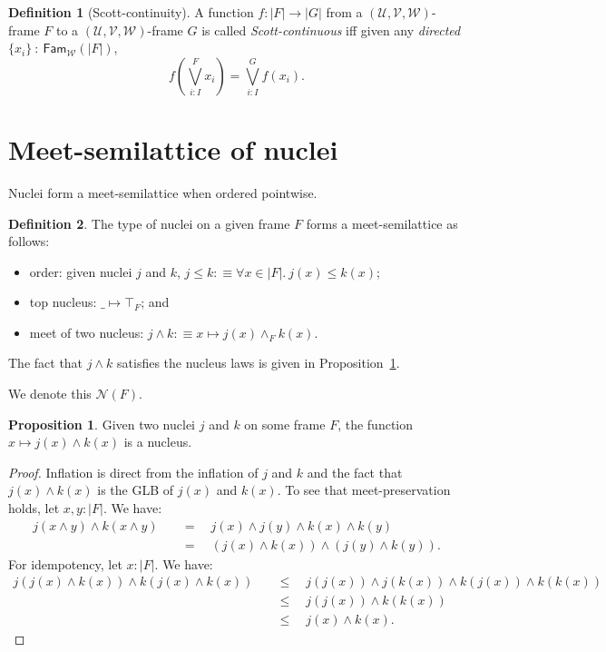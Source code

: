 \documentclass[a4paper, 11pt]{article}
\theoremstyle{definition}
\newtheorem{prop}{Proposition}
\newtheorem{defn}{Definition}
\newcommand{\UU}{\mathcal{U}}
\newcommand{\VV}{\mathcal{V}}
\newcommand{\WW}{\mathcal{W}}
\begin{document}
\begin{defn}[Scott-continuity]
  A function $f : | F | \rightarrow | G | $ from a $(\UU, \VV, \WW)$-frame $F$ to a $(\UU, \VV, \WW)$-frame
  $G$ is called \emph{Scott-continuous} iff given any \emph{directed}
  $\{ x_i \}~:~\mathsf{Fam}_{\WW}(| F |)$,
  \begin{equation*}
    f\left(\bigvee^F_{i : I} x_i\right) = \bigvee^G_{i : I} f(x_i).
  \end{equation*}
\end{defn}

\section{Meet-semilattice of nuclei}

Nuclei form a meet-semilattice when ordered pointwise.

\begin{defn}\label{defn:nuclei-semilattice}
  The type of nuclei on a given frame $F$ forms a meet-semilattice as follows:
  \begin{itemize}
    \item order: given nuclei $j$ and $k$, $j \le k :\equiv \forall x \in | F |.\ j(x) \le k(x)$;
    \item top nucleus: $\_ \mapsto \top_F$; and
    \item meet of two nucleus: $j \wedge k :\equiv x \mapsto j(x) \wedge_F k(x)$.
  \end{itemize}
  The fact that $j \wedge k$ satisfies the nucleus laws is given in Proposition~\ref{prop:nuclei-meet}.
\end{defn}

We denote this $\mathcal{N}(F)$.

\begin{prop}\label{prop:nuclei-meet}
  Given two nuclei $j$ and $k$ on some frame $F$, the function $x \mapsto j(x) \wedge k(x)$ is a nucleus.
\end{prop}
\begin{proof}
  Inflation is direct from the inflation of $j$ and $k$ and the fact that $j(x) \wedge k(x)$ is the GLB
  of $j(x)$ and $k(x)$. To see that meet-preservation holds, let $x, y : | F |$. We have:
  \begin{align*}
    j (x \wedge y) \wedge k (x \wedge y) &\quad=\quad j(x) \wedge j(y) \wedge k(x) \wedge k(y) \\
                          &\quad=\quad (j(x) \wedge k(x)) \wedge (j(y) \wedge k(y)).
  \end{align*}
  For idempotency, let $x : | F |$. We have:
  \begin{align*}
    j (j(x) \wedge k(x)) \wedge k(j(x) \wedge k(x)) &\quad\le\quad j(j(x)) \wedge j(k(x)) \wedge k(j(x)) \wedge k(k(x)) \\
                                     &\quad\le\quad j(j(x)) \wedge k(k(x)) & \\
                                     &\quad\le\quad j(x) \wedge k(x).
  \end{align*}
\end{proof}
\end{document}
